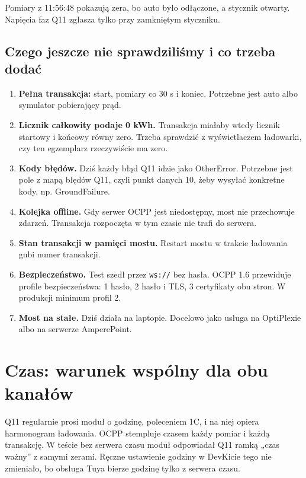 \documentclass[11pt,a4paper]{article}
\begin{document}
Pomiary z 11:56:48 pokazują zera, bo auto było odłączone, a stycznik otwarty. Napięcia faz Q11 zgłasza tylko przy zamkniętym styczniku.


\subsection{Czego jeszcze nie sprawdziliśmy i co trzeba dodać}

\begin{enumerate}
\item \textbf{Pełna transakcja:} start, pomiary co 30 s i koniec. Potrzebne jest auto albo symulator pobierający prąd.
\item \textbf{Licznik całkowity podaje 0 kWh.} Transakcja miałaby wtedy licznik startowy i końcowy równy zero. Trzeba sprawdzić z wyświetlaczem ładowarki, czy ten egzemplarz rzeczywiście ma zero.
\item \textbf{Kody błędów.} Dziś każdy błąd Q11 idzie jako OtherError. Potrzebne jest pole z mapą błędów Q11, czyli punkt danych 10, żeby wysyłać konkretne kody, np. GroundFailure.
\item \textbf{Kolejka offline.} Gdy serwer OCPP jest niedostępny, most nie przechowuje zdarzeń. Transakcja rozpoczęta w tym czasie nie trafi do serwera.
\item \textbf{Stan transakcji w pamięci mostu.} Restart mostu w trakcie ładowania gubi numer transakcji.
\item \textbf{Bezpieczeństwo.} Test szedł przez \texttt{ws://} bez hasła. OCPP 1.6 przewiduje profile bezpieczeństwa: 1 hasło, 2 hasło i TLS, 3 certyfikaty obu stron. W produkcji minimum profil 2.
\item \textbf{Most na stałe.} Dziś działa na laptopie. Docelowo jako usługa na OptiPlexie albo na serwerze AmperePoint.
\end{enumerate}

\clearpage

\section{Czas: warunek wspólny dla obu kanałów}

Q11 regularnie prosi moduł o godzinę, poleceniem 1C, i na niej opiera harmonogram ładowania. OCPP stempluje czasem każdy pomiar i każdą transakcję. W teście bez serwera czasu moduł odpowiadał Q11 ramką „czas ważny” z samymi zerami. Ręczne ustawienie godziny w DevKicie tego nie zmieniało, bo obsługa Tuya bierze godzinę tylko z serwera czasu.
\end{document}
